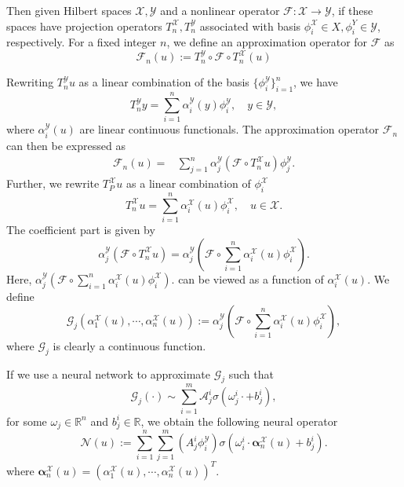 \documentclass[preprint,12pt]{elsarticle}
\theoremstyle{plain}
\numberwithin{figure}{section}
\numberwithin{table}{section}
\begin{document}
Then given Hilbert spaces $\mathcal{X},\mathcal{Y}$ and a nonlinear operator $\mathcal{F}:\mathcal{X}\rightarrow \mathcal{Y}$, if these spaces have projection operators $T^\mathcal{X}_n,T^\mathcal{Y}_n$ associated with basis $\phi_i^\mathcal{X}\in X,\phi_i^Y\in \mathcal{Y}$, respectively. For a fixed integer $n$, we define an approximation operator for $\mathcal{F}$ as
\begin{equation}
	\mathcal{F}_n (u):=	T^\mathcal{Y}_n \circ \mathcal{F} \circ T^\mathcal{X}_n (u)
\end{equation} 


Rewriting $T_n^\mathcal{Y}u$ as a linear combination of the basis $\{\phi_i^\mathcal{Y}\}_{i=1}^n$, we have 
\begin{equation}
	T_n^\mathcal{Y}y=\sum_{i=1}^{n}\alpha_i^\mathcal{Y}(y)\phi^\mathcal{Y}_i,\quad y\in \mathcal{Y},
\end{equation}
where $\alpha_i^\mathcal{Y}(u)$ are linear continuous functionals. 
The approximation operator $\mathcal{F}_n$  can then be expressed as
\begin{equation}
	\begin{aligned}
		\mathcal{F}_n(u) =& \sum_{j=1}^{n} \alpha^\mathcal{Y}_j(\mathcal{F}\circ T^\mathcal{X}_nu)\phi_j^\mathcal{Y}. 
	\end{aligned}
\end{equation}
Further, we rewrite $T^\mathcal{X}_Pu$ as a linear combination of $\phi^\mathcal{X}_i$
\begin{equation}
	T^\mathcal{X}_nu = \sum_{i=1}^{n}\alpha_i^\mathcal{X}(u)\phi^\mathcal{X}_i,\quad u\in \mathcal{X}.
\end{equation}
The coefficient part is given by
\begin{equation}
	\alpha^\mathcal{Y}_j(\mathcal{F}\circ T^\mathcal{X}_nu) = \alpha^\mathcal{Y}_j(\mathcal{F}\circ \sum_{i=1}^n\alpha_i^\mathcal{X}(u)\phi^\mathcal{X}_i).
\end{equation}
Here, $\alpha^\mathcal{Y}_j(\mathcal{F}\circ \sum_{i=1}^n\alpha_i^\mathcal{X}(u)\phi^\mathcal{X}_i).$ can be viewed as a function of $\alpha^\mathcal{X}_i(u)$. We define
\begin{equation}\label{eq:g}
	\mathcal{G}_j(\alpha_1^\mathcal{X}(u),\cdots,\alpha_n^\mathcal{X}(u)):=	\alpha^\mathcal{Y}_j(\mathcal{F}\circ \sum_{i=1}^n\alpha_i^\mathcal{X}(u)\phi^\mathcal{X}_i),
\end{equation}
where $\mathcal{G}_j$ is clearly a continuous function.

If we use a neural network to approximate $\mathcal{G}_j$ such that $$
\mathcal{G}_j(\cdot)\sim \sum_{i=1}^m\mathcal{A}_j^i\sigma (\omega_j^i\cdot+b_j^i),
$$
for some $\omega_j\in\mathbb{R}^n$ and $b_j^i\in\mathbb{R}$, we obtain the following neural operator
\begin{equation}
	\mathcal{N}(u):= \sum_{i=1}^n \sum_{j=1}^m \left({A}_j^i\phi_i^\mathcal{Y}\right) \sigma(\omega_i^i\cdot\bm{\alpha}_n^\mathcal{X}(u)+b_j^i).
\end{equation}
where $\bm{\alpha}^\mathcal{X}_n(u) = (\alpha^\mathcal{X}_1(u),\cdots,\alpha^\mathcal{X}_n(u))^T$. 
\end{document}
